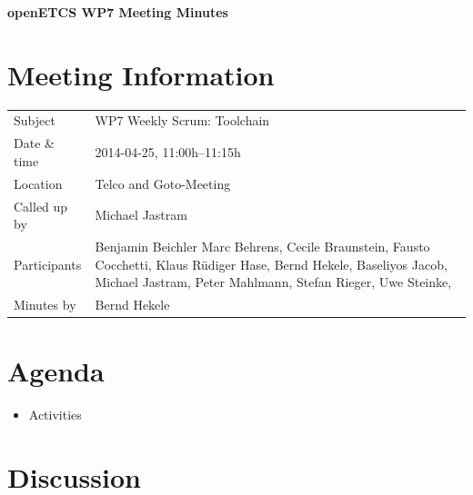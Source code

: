 \documentclass[a4paper, 11pt]{article}
\begin{document}
{\begin{center}\huge\bf openETCS WP7 Meeting Minutes\end{center}}
\section{Meeting Information}

\renewcommand{\arraystretch}{1.5}
\begin{supertabular}{m{.2\textwidth}m{.8\textwidth}}
Subject & WP7 Weekly Scrum: Toolchain\\
Date \& time & 2014-04-25, 11:00h--11:15h\\
Location & Telco and Goto-Meeting\\
Called up by & Michael Jastram\\
Participants &
Benjamin Beichler
Marc Behrens,
Cecile Braunstein,
Fausto Cocchetti,
Klaus R\"udiger Hase,
Bernd Hekele,
Baseliyos Jacob,
Michael Jastram,
Peter Mahlmann,
Stefan Rieger,
Uwe Steinke,
\\

Minutes by & Bernd Hekele\\

\end{supertabular}
\renewcommand{\arraystretch}{1.0}


\section{Agenda}
\begin{itemize}
\item Activities
\end{itemize}

\section{Discussion}
\end{document}
